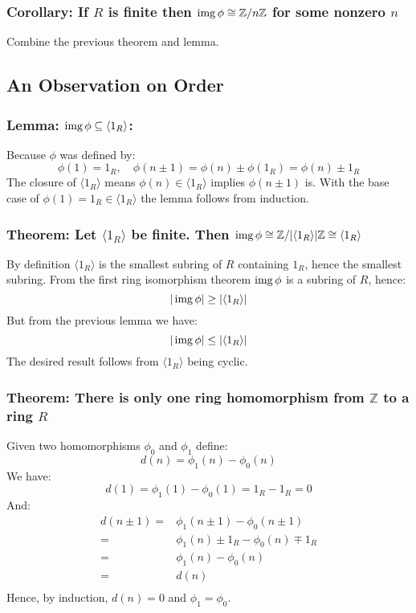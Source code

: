 \subsubsection{Corollary: If $R$ is finite then $\operatorname{img}\phi\cong\mathbb{Z}/n\mathbb{Z}$ for some nonzero $n$}
Combine the previous theorem and lemma.

\subsection{An Observation on Order}
\subsubsection{Lemma: $\operatorname{img}\phi \subseteq \langle 1_R \rangle$:}
Because $\phi$ was defined by:
\[\phi(1)=1_R,\quad \phi(n\pm 1) = \phi(n)\pm \phi(1_R)= \phi(n)\pm 1_R\]
The closure of $\langle 1_R \rangle$ means $\phi(n)\in\langle 1_R \rangle$ implies $\phi(n\pm 1)$ is.
With the base case of $\phi(1) = 1_R \in \langle 1_R \rangle$ the lemma follows from induction.

\subsubsection{Theorem: Let $\langle 1_R\rangle$ be finite. Then $\operatorname{img}\phi\cong\mathbb{Z}/|\langle 1_R\rangle|\mathbb{Z}\cong\langle 1_R\rangle$}
By definition $\langle 1_R \rangle$ is the smallest subring of $R$ containing $1_R$,
hence the smallest subring.
From the first ring isomorphism theorem $\operatorname{img}\phi$ is a subring of $R$,
hence:
\[|\operatorname{img}\phi| \geq |\langle 1_R \rangle|\]
But from the previous lemma we have:
\[|\operatorname{img}\phi| \leq |\langle 1_R \rangle|\]
The desired result follows from $\langle 1_R \rangle$ being cyclic.

\subsubsection{Theorem: There is only one ring homomorphism from $\mathbb{Z}$ to a ring $R$}
Given two homomorphisms $\phi_0$ and $\phi_1$ define:
\[d(n) = \phi_1(n)-\phi_0(n)\]
We have:
\[d(1) = \phi_1(1)-\phi_0(1) = 1_R-1_R = 0\]
And:
\begin{equation*}
\begin{aligned}
	d(n\pm1) =& \phi_1(n\pm1) - \phi_0(n\pm1) \\
	=& \phi_1(n) \pm 1_R - \phi_0(n) \mp 1_R \\
	=& \phi_1(n) - \phi_0(n) \\
	=&d(n)\\
\end{aligned}
\end{equation*}
Hence,
by induction,
$d(n)=0$ and $\phi_1 = \phi_0$.

